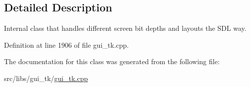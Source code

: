 \subsection{Detailed Description}
Internal class that handles different screen bit depths and layouts the S\-D\-L way. 

Definition at line 1906 of file gui\-\_\-tk.\-cpp.



The documentation for this class was generated from the following file\-:\begin{DoxyCompactItemize}
\item 
src/libs/gui\-\_\-tk/\hyperlink{gui__tk_8cpp}{gui\-\_\-tk.\-cpp}\end{DoxyCompactItemize}
